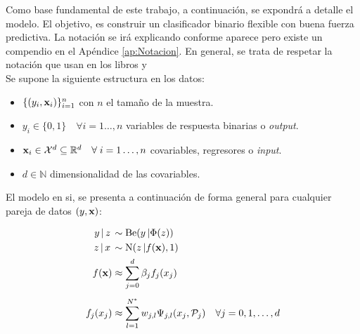 \documentclass[../Main/Main.tex]{subfiles}
\begin{document}
Como base fundamental de este trabajo, a continuación, se expondrá a detalle el modelo. El objetivo, es construir un clasificador binario flexible con buena fuerza predictiva. La notación se irá explicando conforme aparece pero existe un compendio en el Apéndice \ref{ap:Notacion}. En general, se trata de respetar la notación que usan en los libros \autocite{hastie2008elements} y \autocite{james2013introduction}\\

Se supone la siguiente estructura en los datos:
\begin{itemize}
	\item $\{(y_i,\mathbf{x}_i)\}_{i = 1}^n$ con $n$ el tamaño de la muestra.
	\item $y_i \in \{0,1\}\quad \forall i = 1\ldots,n$  variables de respuesta binarias o \textit{output}.
	\item $\mathbf{x}_i \in \mathcal{X}^d \subseteq \mathbb{R}^d \quad \forall \; i = 1\ldots,n$ covariables, regresores o \textit{input}.
	\item $d \in \mathbb{N}$ dimensionalidad de las covariables.
\end{itemize}

El modelo en si, se presenta a continuación de forma general para cualquier pareja de datos $(y,\mathbf{x})$:

\begin{align}
y\,|\,z\, &\sim \text{Be}(y\,|\Phi(z)) \label{ec:Y-Z} \\ 
z\,|\,x\, &\sim \text{N}(z\,|f(\mathbf{x}),1) \label{ec:Z-X}\\
f(\mathbf{x}) &\approx \sum_{j=0}^d \beta_j f_j(x_j) \label{ec:fproy} \\[4pt]
f_j(x_j) &\approx \sum_{l = 1}^{N^*} w_{j,l} \Psi_{j,l}(x_j, \mathcal{P}_j) \quad \forall j= 0,1,\ldots,d \label{ec:fj}
\end{align}	
\end{document}
